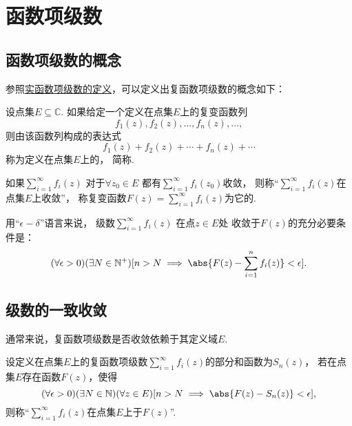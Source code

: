 \section{函数项级数}
\subsection{函数项级数的概念}
参照\hyperref[definition:无穷级数.实函数项级数的概念]{实函数项级数的定义}，可以定义出复函数项级数的概念如下：
\begin{definition}\label{definition:解析函数的级数表示.收敛级数}
设点集\(E \subseteq \mathbb{C}\).
如果给定一个定义在点集\(E\)上的复变函数列\begin{equation*}
	f_1(z), f_2(z), \dotsc, f_n(z), \dotsc,
\end{equation*}
则由该函数列构成的表达式\begin{equation*}
	f_1(z) + f_2(z) + \dotsb + f_n(z) + \dotsb
\end{equation*}
称为定义在点集\(E\)上的，
简称.

如果\(\sum_{i=1}^\infty f_i(z)\)
对于\(\forall z_0 \in E\)
都有\(\sum_{i=1}^\infty f_i(z_0)\)收敛，
则称“\(\sum_{i=1}^\infty f_i(z)\)在点集\(E\)上收敛”，
称复变函数\(F(z) = \sum_{i=1}^\infty f_i(z)\)为它的.
\end{definition}
用“\(\epsilon-\delta\)”语言来说，
级数\(\sum_{i=1}^\infty f_i(z)\)
在点\(z \in E\)处
收敛于\(F(z)\)的充分必要条件是：\begin{equation*}
	(\forall \epsilon > 0)
	(\exists N \in \mathbb{N}^+)
	[
		n > N
		\implies
		\abs{F(z) - \sum_{i=1}^n f_i(z)} < \epsilon
	].
\end{equation*}

\subsection{级数的一致收敛}
通常来说，复函数项级数是否收敛依赖于其定义域\(E\).
\begin{definition}\label{definition:解析函数的级数表示.一致收敛级数}
设定义在点集\(E\)上的复函数项级数\(\sum_{i=1}^\infty f_i(z)\)的部分和函数为\(S_n(z)\)，
若在点集\(E\)存在函数\(F(z)\)，使得\begin{equation*}
	(\forall\epsilon>0)
	(\exists N \in \mathbb{N})
	(\forall z \in E)
	[
		n>N \implies \abs{F(z) - S_n(z)} < \epsilon
	],
\end{equation*}
则称“\(\sum_{i=1}^\infty f_i(z)\)在点集\(E\)上于\(F(z)\)”.
\end{definition}


